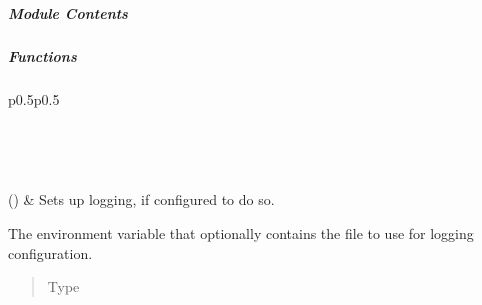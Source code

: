 \documentclass[letterpaper,10pt,english]{sphinxmanual}
\begin{document}
\subparagraph{Module Contents}
\label{\detokenize{autoapi/pine/client/log/index:module-contents}}

\subparagraph{Functions}
\label{\detokenize{autoapi/pine/client/log/index:functions}}

\begin{savenotes}\sphinxatlongtablestart\begin{longtable}[c]{p{0.5\linewidth}p{0.5\linewidth}}
\hline

\endfirsthead

%
{}\\
\hline

\endhead

\hline
{}\\
\endfoot

\endlastfoot

{\hyperref[\detokenize{autoapi/pine/client/log/index:pine.client.log.setup_logging}]{}}()
&
Sets up logging, if configured to do so.
\\
\hline
\end{longtable}\sphinxatlongtableend\end{savenotes}

\begin{fulllineitems}
\label{\detokenize{autoapi/pine/client/log/index:pine.client.log.CONFIG_FILE_ENV}}
The environment variable that optionally contains the file to use for logging configuration.
\begin{quote}\begin{description}
\item[{Type}] \leavevmode
{}

\end{description}\end{quote}

\end{fulllineitems}

\end{document}
